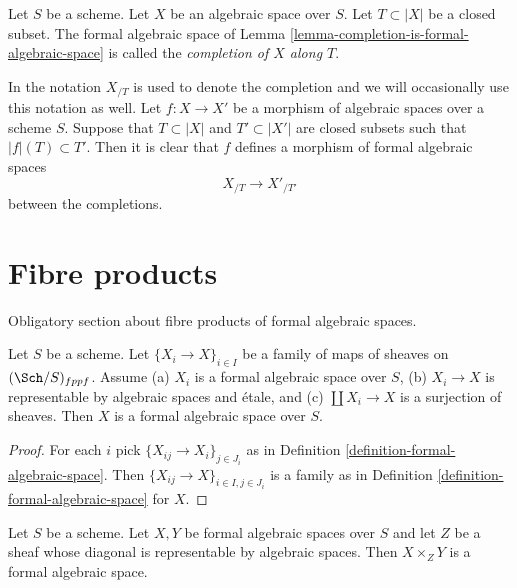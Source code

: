 \begin{definition}
\label{definition-completion}
Let $S$ be a scheme. Let $X$ be an algebraic space over $S$.
Let $T \subset |X|$ be a closed subset. The formal algebraic space
of Lemma \ref{lemma-completion-is-formal-algebraic-space}
is called the {\it completion of $X$ along $T$}.
\end{definition}

\noindent
In \cite[Chapter I, Section 10.8]{EGA} the notation $X_{/T}$
is used to denote the completion and we will occasionally use
this notation as well. Let $f : X \to X'$ be
a morphism of algebraic spaces over a scheme $S$. Suppose
that $T \subset |X|$ and $T' \subset |X'|$ are closed subsets
such that $|f|(T) \subset T'$. Then it is clear that
$f$ defines a morphism of formal algebraic spaces
$$
X_{/T} \longrightarrow X'_{/T'}
$$
between the completions.



\section{Fibre products}
\label{section-fibre-products}

\noindent
Obligatory section about fibre products of formal algebraic spaces.

\begin{lemma}
\label{lemma-etale-covering-by-formal-algebraic-spaces}
Let $S$ be a scheme. Let $\{X_i \to X\}_{i \in I}$ be a family of maps
of sheaves on $(\Sch/S)_{fppf}$. Assume (a) $X_i$ is a
formal algebraic space over $S$, (b) $X_i \to X$ is representable
by algebraic spaces and \'etale, and (c) $\coprod X_i \to X$
is a surjection of sheaves. Then $X$ is a formal algebraic space
over $S$.
\end{lemma}

\begin{proof}
For each $i$ pick $\{X_{ij} \to X_i\}_{j \in J_i}$ as in
Definition \ref{definition-formal-algebraic-space}.
Then $\{X_{ij} \to X\}_{i \in I, j \in J_i}$ is a family
as in Definition \ref{definition-formal-algebraic-space}
for $X$.
\end{proof}

\begin{lemma}
\label{lemma-fibre-products-general}
Let $S$ be a scheme. Let $X, Y$ be formal algebraic spaces over $S$
and let $Z$ be a sheaf whose diagonal is representable by
algebraic spaces. Then $X \times_Z Y$ is a formal algebraic space.
\end{lemma}


